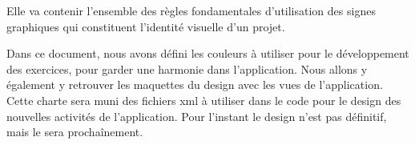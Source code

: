 Elle va contenir l'ensemble des règles fondamentales d'utilisation des signes graphiques qui constituent l'identité visuelle d'un projet.


Dans ce document, nous avons défini les couleurs à utiliser pour le développement des exercices, pour garder une harmonie dans l'application. Nous allons y également y retrouver les maquettes du design avec les vues de l'application. Cette charte sera muni des fichiers xml à utiliser dans le code pour le design des nouvelles activités de l'application. Pour l'instant le design n'est pas définitif, mais le sera prochaînement.
